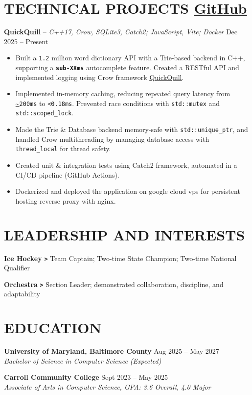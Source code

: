 \documentclass[11pt]{article}
\begin{document}
\section*{
TECHNICAL PROJECTS 
{\normalfont\normalsize\color{black}\underline{\href{https://github.com/NicholasSobchak}{GitHub}}}
}
\noindent\textbf{QuickQuill} -- \textit{C++17, Crow, SQLite3, Catch2; JavaScript, Vite; Docker} \hfill Dec 2025 -- Present
\vspace{-2pt} %
\begin{itemize}[label=\texttt{\textbf{>}}]
  \item Built a \texttt{1.2} million word dictionary API with a Trie-based backend in C++, supporting a \texttt{\textbf{sub-XXms}} autocomplete feature. Created a RESTful API and implemented logging using Crow framework \underline{\href{https://quickquill.ink/}{QuickQuill}}.
  \item Implemented in-memory caching, reducing repeated query latency from \url{~}\texttt{200ms} to \texttt{<0.18ms}. Prevented race conditions with \texttt{std::mutex} and \texttt{std::scoped\_lock}.
  \item Made the Trie \& Database backend memory-safe with \texttt{std::unique\_ptr}, and handled Crow multithreading by managing database access with \texttt{thread\_local} for thread safety. 
  \item Created unit \& integration tests using Catch2 framework, automated in a CI/CD pipeline (GitHub Actions).
  \item Dockerized and deployed the application on google cloud vps for persistent hosting reverse proxy with nginx.
\end{itemize} 

\section*{LEADERSHIP AND INTERESTS}
\textbf{Ice Hockey} \texttt{\textbf{>}} Team Captain; Two-time State Champion; Two-time National Qualifier

\textbf{Orchestra} \texttt{\textbf{>}} Section Leader; demonstrated collaboration, discipline, and adaptability

\section*{EDUCATION}
\textbf{University of Maryland, Baltimore County} \hfill Aug 2025 -- May 2027\\
\textit{Bachelor of Science in Computer Science (Expected)}

\textbf{Carroll Community College} \hfill Sept 2023 -- May 2025\\
\textit{Associate of Arts in Computer Science, GPA: 3.6 Overall, 4.0 Major}
\end{document}
